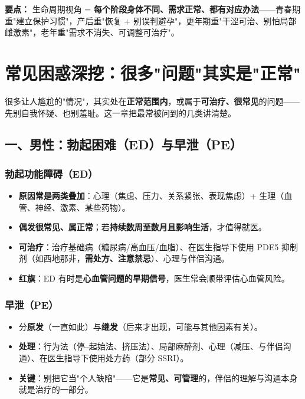 \documentclass[12pt,UTF8,openany]{ctexbook}
\begin{document}
\vspace{1em}
\noindent\textbf{要点：} 生命周期视角 = \textbf{每个阶段身体不同、需求正常、都有对应办法}——青春期重"建立保护习惯"，产后重"恢复 + 别误判避孕"，更年期重"干涩可治、别怕局部雌激素"，老年重"需求不消失、可调整可治疗"。

\chapter{常见困惑深挖：很多"问题"其实是"正常"}
\label{chap:concerns}

很多让人尴尬的"情况"，其实处在\textbf{正常范围内}，或属于\textbf{可治疗、很常见}的问题——先别自我怀疑、也别羞耻。这一章把最常被问到的几类讲清楚。

\section{一、男性：勃起困难（ED）与早泄（PE）}

\subsection*{勃起功能障碍（ED）}
\begin{itemize}[leftmargin=2em,itemsep=0.3em]
  \item \textbf{原因常是两类叠加}：心理（焦虑、压力、关系紧张、表现焦虑）+ 生理（血管、神经、激素、某些药物）。
  \item \textbf{偶发很常见、属正常}；若\textbf{持续数周至数月且影响生活}，才值得就医。
  \item \textbf{可治疗}：治疗基础病（糖尿病/高血压/血脂）、在医生指导下使用 PDE5 抑制剂（如西地那非，\textbf{需处方、注意禁忌}）、心理与伴侣沟通。
  \item \textbf{红旗}：ED 有时是\textbf{心血管问题的早期信号}，医生常会顺带评估心血管风险。
\end{itemize}

\subsection*{早泄（PE）}
\begin{itemize}[leftmargin=2em,itemsep=0.3em]
  \item 分\textbf{原发}（一直如此）与\textbf{继发}（后来才出现，可能与其他因素有关）。
  \item \textbf{处理}：行为法（停--起始法、挤压法）、局部麻醉剂、心理（减压、与伴侣沟通）、在医生指导下使用处方药（部分 SSRI）。
  \item \textbf{关键}：别把它当"个人缺陷"——它是\textbf{常见、可管理}的，伴侣的理解与沟通本身就是治疗的一部分。
\end{itemize}
\end{document}
